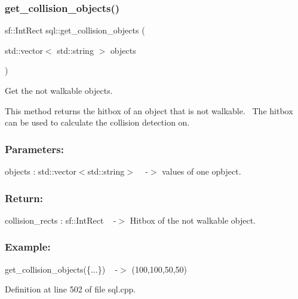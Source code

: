 \subsubsection{\texorpdfstring{get\+\_\+collision\+\_\+objects()}{get\_collision\_objects()}}
{\footnotesize\ttfamily sf\+::\+Int\+Rect sql\+::get\+\_\+collision\+\_\+objects (\begin{DoxyParamCaption}\item[{std\+::vector$<$ std\+::string $>$}]{objects }\end{DoxyParamCaption})}



Get the not walkable objects. 

This method returns the hitbox of an object that is not walkable.~\newline
The hitbox can be used to calculate the collision detection on. ~\newline
 \subsubsection*{Parameters\+: }

objects \+: std\+::vector$<$std\+::string$>$ ~\newline
-\/$>$ values of one opbject.

\subsubsection*{Return\+: }

collision\+\_\+rects \+: sf\+::\+Int\+Rect ~\newline
-\/$>$ Hitbox of the not walkable object.~\newline


\subsubsection*{Example\+: }

get\+\_\+collision\+\_\+objects(\{...\}) ~\newline
-\/$>$ (100,100,50,50) 

Definition at line 502 of file sql.\+cpp.

